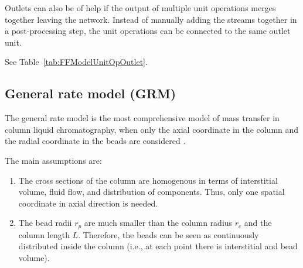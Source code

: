 Outlets can also be of help if the output of multiple unit operations merges together leaving the network.
Instead of manually adding the streams together in a post-processing step, the unit operations can be connected to the same outlet unit.

See Table~\ref{tab:FFModelUnitOpOutlet}.

\subsection{General rate model (GRM)}\label{sec:MUOPGRM}

The general rate model  is the most comprehensive model of mass transfer in column liquid chromatography, when only the axial coordinate in the column and the radial coordinate in the beads are considered \cite{Kucera1965,Gu1995,Guiochon2006,Felinger2004}.

The main assumptions are:
\begin{enumerate}
	\item The cross sections of the column are homogenous in terms of interstitial volume, fluid flow, and distribution of components. Thus, only one spatial coordinate in axial direction is needed.
	\item The bead radii $r_{p}$ are much smaller than the column radius $r_c$ and the column length $L$. Therefore, the beads can be seen as continuously distributed inside the column (i.e., at each point there is interstitial and bead volume).
\end{enumerate}

